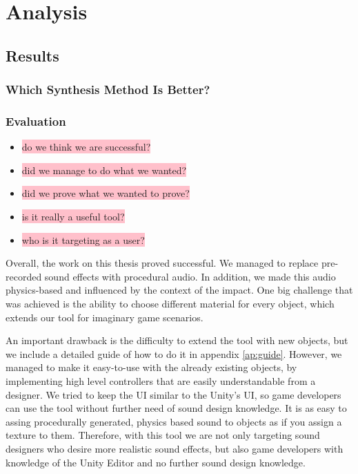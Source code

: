 \chapter{Analysis}\label{ch:analysis}

\section{Results}

\subsection{Which Synthesis Method Is Better?}

\subsection{Evaluation}
\begin{itemize}
\item \colorbox{pink}{do we think we are successful?}
\item \colorbox{pink}{did we manage to do what we wanted?}
\item \colorbox{pink}{did we prove what we wanted to prove?}
\item \colorbox{pink}{is it really a useful tool?}
\item \colorbox{pink}{who is it targeting as a user?}
\end{itemize} 

Overall, the work on this thesis proved successful. We managed to replace pre-recorded sound effects with procedural audio. In addition, we made this audio physics-based and influenced by the context of the impact. One big challenge that was achieved is the ability to choose different material for every object, which extends our tool for imaginary game scenarios. 

An important drawback is the difficulty to extend the tool with new objects, but we include a detailed guide of how to do it in appendix \ref{ap:guide}. However, we managed to make it easy-to-use with the already existing objects, by implementing high level controllers that are easily understandable from a designer. We tried to keep the UI similar to the Unity's UI, so game developers can use the tool without further need of sound design knowledge. It is as easy to assing procedurally generated, physics based sound to objects as if you assign a texture to them. Therefore, with this tool we are not only targeting sound designers who desire more realistic sound effects, but also game developers with knowledge of the Unity Editor and no further sound design knowledge.

